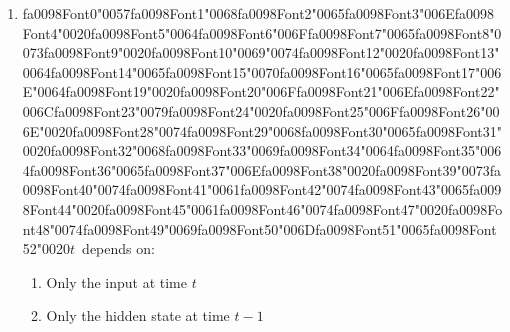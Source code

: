 \documentclass[12pt]{article}
\begin{document}
\begin{enumerate}[label=Q\arabic*.]
\begin{enumerate}[label=(\Alph*)]
    \item The current word given itself
    \item All words simultaneously
\end{enumerate}
\item {\csname fa0098Font0\endcsname\char"0057}{\csname fa0098Font1\endcsname\char"0068}{\csname fa0098Font2\endcsname\char"0065}{\csname fa0098Font3\endcsname\char"006E}{\csname fa0098Font4\endcsname\char"0020}{\csname fa0098Font5\endcsname\char"0064}{\csname fa0098Font6\endcsname\char"006F}{\csname fa0098Font7\endcsname\char"0065}{\csname fa0098Font8\endcsname\char"0073}{\csname fa0098Font9\endcsname\char"0020}{\csname fa0098Font10\endcsname\char"0069}{\char"0074}{\csname fa0098Font12\endcsname\char"0020}{\csname fa0098Font13\endcsname\char"0064}{\csname fa0098Font14\endcsname\char"0065}{\csname fa0098Font15\endcsname\char"0070}{\csname fa0098Font16\endcsname\char"0065}{\csname fa0098Font17\endcsname\char"006E}{\char"0064}{\csname fa0098Font19\endcsname\char"0020}{\csname fa0098Font20\endcsname\char"006F}{\csname fa0098Font21\endcsname\char"006E}{\csname fa0098Font22\endcsname\char"006C}{\csname fa0098Font23\endcsname\char"0079}{\csname fa0098Font24\endcsname\char"0020}{\csname fa0098Font25\endcsname\char"006F}{\csname fa0098Font26\endcsname\char"006E}{\char"0020}{\csname fa0098Font28\endcsname\char"0074}{\csname fa0098Font29\endcsname\char"0068}{\csname fa0098Font30\endcsname\char"0065}{\csname fa0098Font31\endcsname\char"0020}{\csname fa0098Font32\endcsname\char"0068}{\csname fa0098Font33\endcsname\char"0069}{\csname fa0098Font34\endcsname\char"0064}{\csname fa0098Font35\endcsname\char"0064}{\csname fa0098Font36\endcsname\char"0065}{\csname fa0098Font37\endcsname\char"006E}{\csname fa0098Font38\endcsname\char"0020}{\csname fa0098Font39\endcsname\char"0073}{\csname fa0098Font40\endcsname\char"0074}{\csname fa0098Font41\endcsname\char"0061}{\csname fa0098Font42\endcsname\char"0074}{\csname fa0098Font43\endcsname\char"0065}{\csname fa0098Font44\endcsname\char"0020}{\csname fa0098Font45\endcsname\char"0061}{\csname fa0098Font46\endcsname\char"0074}{\csname fa0098Font47\endcsname\char"0020}{\csname fa0098Font48\endcsname\char"0074}{\csname fa0098Font49\endcsname\char"0069}{\csname fa0098Font50\endcsname\char"006D}{\csname fa0098Font51\endcsname\char"0065}{\csname fa0098Font52\endcsname\char"0020}$t$\  depends on:
\begin{enumerate}[label=(\Alph*)]
    \item Only the input at time $t$
    \item Only the hidden state at time $t-1$

\end{enumerate}
\end{enumerate}
\end{document}
